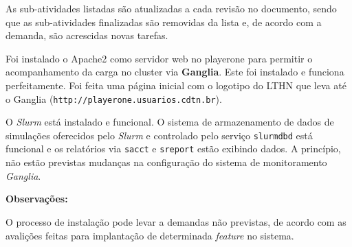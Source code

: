 
As sub-atividades listadas são atualizadas a cada revisão no documento, sendo que 
as sub-atividades finalizadas são removidas da lista e, de acordo com a demanda, 
são acrescidas novas tarefas. %

Foi instalado o Apache2 como servidor web no playerone para permitir o acompanhamento da carga no cluster via \textbf{Ganglia}. Este foi instalado 
e funciona perfeitamente. Foi feita uma página inicial com o logotipo do LTHN 
que leva até o Ganglia (\texttt{http://playerone.usuarios.cdtn.br}).

O \textit{Slurm} está instalado e funcional. O sistema de armazenamento de dados de simulações oferecidos pelo \textit{Slurm} e controlado pelo serviço \texttt{slurmdbd} está funcional e os relatórios via \texttt{sacct} e \texttt{sreport} estão exibindo dados. %
A princípio, não estão previstas mudanças na configuração do sistema de monitoramento \textit{Ganglia}.





\textbf{Observações:}

O processo de instalação pode levar a demandas não previstas, de acordo com as avalições feitas para implantação de determinada \textit{feature} no sistema.

